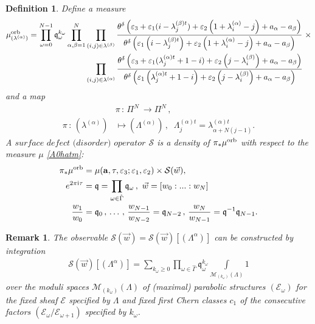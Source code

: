 \documentclass[12pt]{article}
\newtheorem{defn}{Definition}[section]
\newtheorem{rem}{Remark}[section]
\numberwithin{equation}{section}
\newcommand{\ve}{{\varepsilon}}
\theoremstyle{definition}
\newcommand {\ii} {\mathrm{i}}
\begin{document}
\begin{defn}\normalfont
    Define a measure
    \begin{align*}
    \mu^{\rm orb}_{(\lambda^{(\alpha)})} = \prod\limits_{\omega = 0}^{N-1} \mathfrak{q}_{\omega}^{k_{\omega}}\prod\limits_{\alpha , \beta = 1}^{N} &\prod\limits_{(i, j) \in \lambda^{(\beta)}}  \frac{\theta^{\delta} \left( \varepsilon_3 + \varepsilon_1 (i - \lambda_{j}^{(\beta)t}) + \varepsilon_2 \left( 1 + \lambda_{i}^{(\alpha)} - j \right) + a_{\alpha} - a_{\beta} \right)}{\theta^{\delta} \left( \varepsilon_1 \left(i - \lambda_{j}^{(\beta)t}\right) + \varepsilon_2 \left(1 + \lambda_{i}^{(\alpha)} - j\right) + a_{\alpha} - a_{\beta} \right)} \ \times\\
     &\prod\limits_{(i, j) \in \lambda^{(\alpha)}} \frac{\theta^{\delta} \left( \varepsilon_3 + \varepsilon_1 (\lambda_{j}^{(\alpha)t} + 1 - i) + \varepsilon_2 \left( j -\lambda_{i}^{(\beta)} \right) + a_{\alpha} - a_{\beta}\right)}{\theta^{\delta}\left(\varepsilon_1 \left(\lambda_{j}^{(\alpha)t} + 1 - i \right)  + \varepsilon_2 \left( j -\lambda_{i}^{(\beta)} \right) + a_{\alpha} - a_{\beta}\right)}
\end{align*}
and a map
\begin{align*}
    & \pi \, :\, \Pi^{N} \ \longrightarrow \Pi^{N}\, , \\
  {\pi}\, : \,  (\lambda^{(\alpha)}) &\mapsto (\Lambda^{(\alpha)})\, , \;\; \Lambda_{j}^{(\alpha)t} = \lambda_{\alpha + N(j - 1)}^{(\alpha)t}.
\end{align*}
A $\textit{surface defect (disorder) operator}$ $\mathcal{S}$ is a density of ${\pi}_{*}\mu^{\rm orb}$ with respect to the measure $\mu$ \eqref{A0hatm}:
\begin{align*}
    \pi_{*}\mu^{\rm orb} &= \mu( {\bf a}, \tau , {\ve}_{3} ;\ve_1 , \ve_2 ) \times \mathcal{S}(\vec{w}),\\ 
    e^{2 \pi {\ii} \tau} &= \mathfrak{q} = \prod\limits_{\omega \in \hat{\Gamma}}\mathfrak{q}_{\omega}\, , \ 
    \vec{w} = [w_0: ... : w_{N}]\\
    \frac{w_1}{w_0} &= \mathfrak{q}_{0}\, , \, \ldots  \, , \,  \frac{w_{N-1}}{w_{N-2}} = \mathfrak{q}_{N-2}\, , \, \frac{w_{N}}{w_{N-1}} = \mathfrak{q}^{-1}\mathfrak{q}_{N-1}.
\end{align*}
\end{defn}
\begin{rem}\normalfont
    The observable $\mathcal{S}(\vec{w}) = \mathcal{S}(\vec{w}) [(\Lambda^{\alpha})]$ can be constructed by integration
\begin{align*}
    \mathcal{S}(\vec{w}) [(\Lambda^{\alpha})] = \sum\limits_{k_{\omega} \geq 0} \prod\limits_{\omega \in \hat{\Gamma}}\mathfrak{q}_{\omega}^{k_{\omega}} \int\limits_{\mathcal{M}_{(k_{\omega})}(\Lambda)} 1
\end{align*}
over the moduli spaces $\mathcal{M}_{(k_{\omega})}(\Lambda)$ of (maximal) parabolic structures $(\mathcal{E}_{\omega})$ for the fixed sheaf $\mathcal{E}$ specified by $\Lambda$ and fixed first Chern classes $c_{1}$ of the consecutive factors $(\mathcal{E}_{\omega}/\mathcal{E}_{\omega + 1})$ specified by $k_{\omega}$.
\end{rem}
\end{document}
